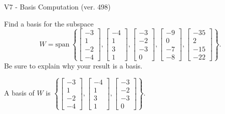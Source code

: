 \begin{exercise}
  \begin{exerciseTitle}V7 - Basis Computation (ver. 498)\end{exerciseTitle}
  \begin{exerciseStatement}
    Find a basis for the subspace 
\[W=\mathrm{span}\ \left\{\left[\begin{array}{r}
-3 \\
1 \\
-2 \\
-4
\end{array}\right] , \left[\begin{array}{r}
-4 \\
1 \\
3 \\
1
\end{array}\right] , \left[\begin{array}{r}
-3 \\
-2 \\
-3 \\
0
\end{array}\right] , \left[\begin{array}{r}
-9 \\
0 \\
-7 \\
-8
\end{array}\right] , \left[\begin{array}{r}
-35 \\
2 \\
-15 \\
-22
\end{array}\right]\right\}.\]
 Be sure to explain why your result is a basis.


  \end{exerciseStatement}
  \begin{exerciseAnswer}
   A basis of \(W\) is  \(\left\{\left[\begin{array}{r}
-3 \\
1 \\
-2 \\
-4
\end{array}\right] , \left[\begin{array}{r}
-4 \\
1 \\
3 \\
1
\end{array}\right] , \left[\begin{array}{r}
-3 \\
-2 \\
-3 \\
0
\end{array}\right]\right\}\).
  


  \end{exerciseAnswer}
\end{exercise}